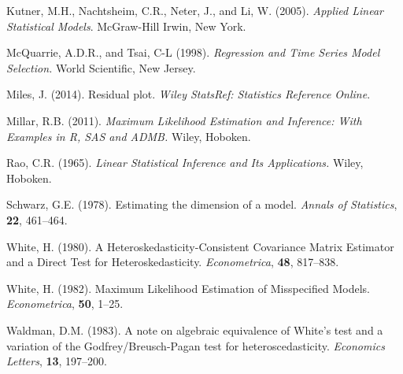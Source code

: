 \documentclass[submit]{smj}
\begin{document}
\begin{thebibliography}{99}
{\rm Kutner, M.H., Nachtsheim, C.R., Neter, J., and Li, W.} (2005).
 \emph{Applied Linear Statistical Models}.
\newblock McGraw-Hill Irwin, New York.

{\rm McQuarrie, A.D.R., and Tsai, C-L} (1998).
 \emph{Regression and Time Series Model Selection.}
\newblock World Scientific, New Jersey.

{\rm Miles, J.} (2014).
\newblock Residual plot.
\newblock \emph{Wiley StatsRef: Statistics Reference Online}.

{\rm Millar, R.B.} (2011).
\newblock \emph{Maximum Likelihood Estimation and Inference: With Examples in R, SAS and ADMB.}
\newblock Wiley, Hoboken.

{\rm Rao, C.R.} (1965).
\newblock \emph{Linear Statistical Inference and Its Applications.}
\newblock Wiley, Hoboken.

{\rm Schwarz, G.E.} (1978).
\newblock Estimating the dimension of a model.
\newblock \emph{Annals of Statistics}, {\bf 22},  461--464.

{\rm White, H.} (1980).
\newblock A Heteroskedasticity-Consistent Covariance Matrix Estimator and a Direct Test for Heteroskedasticity.
\newblock \emph{Econometrica}, {\bf 48},  817--838.

{\rm White, H.} (1982).
\newblock Maximum Likelihood Estimation of Misspecified Models.
\newblock \emph{Econometrica}, {\bf 50},  1--25.

{\rm Waldman, D.M.} (1983).
\newblock A note on algebraic equivalence of White's test and a variation of the Godfrey/Breusch-Pagan test for heteroscedasticity.
\newblock \emph{Economics Letters}, {\bf 13},  197--200.

\end{thebibliography}

\fi
\end{document}
